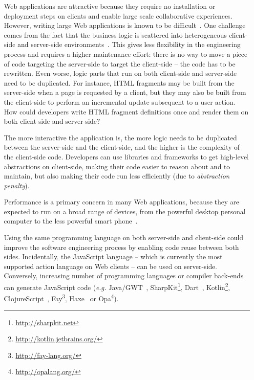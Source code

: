 \documentclass[preprint]{sigplanconf}
\newcommand{\eg}{\emph{e.g.}}
\begin{document}
Web applications are attractive because they require no installation or deployment steps on clients
and enable large scale collaborative experiences. However, writing large Web applications is known
to be difficult~\cite{Mikkonen08_SpaghettiJs,Preciado05_RIAMethodologyNecessity}. One challenge
comes from the fact that the business logic is scattered into heterogeneous client-side and
server-side environments~\cite{Echeverria09_RIA,Kuuskeri09_PartitioningClientServer}. This gives
less flexibility in the engineering process and requires a higher maintenance effort: there is no
way to move a piece of code targeting the server-side to target the client-side -- the code has to
be rewritten. Even worse, logic parts that run on both client-side and server-side need to be
duplicated. For instance, HTML fragments may be built from the server-side when a page is requested
by a client, but they may also be built from the client-side to perform an incremental update
subsequent to a user action. How could developers write HTML fragment definitions once and render
them on both client-side and server-side?

The more interactive the application is, the more logic needs to be duplicated between the
server-side and the client-side, and the higher is the complexity of the client-side code.
Developers can use libraries and frameworks to get high-level abstractions on client-side, making
their code easier to reason about and to maintain, but also making their code run less efficiently
(due to \emph{abstraction penalty}).

Performance is a primary concern in many Web applications, because they are expected to run on a
broad range of devices, from the powerful desktop personal computer to the less powerful smart
phone~\cite{Souders08_Perf,Huang10_Perf}.

Using the same programming language on both server-side and client-side could improve the software
engineering process by enabling code reuse between both sides. Incidentally, the JavaScript language
-- which is currently the most supported action language on Web clients -- can be used on
server-side. Conversely, increasing number of programming languages or compiler back-ends can
generate JavaScript code (\eg{} Java/GWT~\cite{Chaganti07_GWT},
SharpKit\footnote{\href{http://sharpkit.net}{http://sharpkit.net}}, Dart~\cite{Griffith11_Dart},
Kotlin\footnote{\href{http://kotlin.jetbrains.org/}{http://kotlin.jetbrains.org/}},
ClojureScript~\cite{McGranaghan11_ClojureScript},
Fay\footnote{\href{http://fay-lang.org/}{http://fay-lang.org/}},
Haxe~\cite{Cannasse08_HaXe} or Opa\footnote{\href{http://opalang.org/}{http://opalang.org/}}).
\end{document}

